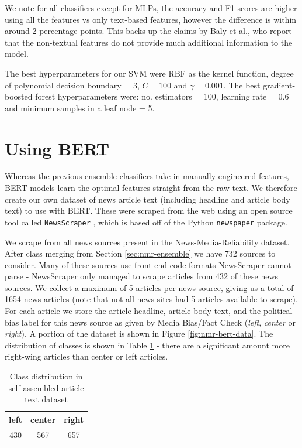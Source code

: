 We note for all classifiers except for MLPs, the accuracy and F1-scores are higher using all the features vs only text-based features, however the difference is within around 2 percentage points. This backs up the claims by Baly et al., who report that the non-textual features do not provide much additional information to the model.

The best hyperparameters for our SVM were RBF as the kernel function, degree of polynomial decision boundary = 3, $ C = 100 $ and $ \gamma = 0.001 $. The best gradient-boosted forest hyperparameters were: no. estimators = 100, learning rate = 0.6 and minimum samples in a leaf node = 5.

\section{Using BERT} \label{sec:nmr-bert}

Whereas the previous ensemble classifiers take in manually engineered features, BERT models learn the optimal features straight from the raw text. We therefore create our own dataset of news article text (including headline and article body text) to use with BERT. These were scraped from the web using an open source tool called \texttt{NewsScraper} \cite{newsscraper}, which is based off of the Python \texttt{newspaper} \cite{newspaper-python} package.

We scrape from all news sources present in the News-Media-Reliability dataset. After class merging from Section \ref{sec:nmr-ensemble} we have 732 sources to consider. Many of these sources use front-end code formats NewsScraper cannot parse - NewsScraper only managed to scrape articles from 432 of these news sources. We collect a maximum of 5 articles per news source, giving us a total of 1654 news articles (note that not all news sites had 5 articles available to scrape). For each article we store the article headline, article body text, and the political bias label for this news source as given by Media Bias/Fact Check (\textit{left}, \textit{center} or \textit{right}). A portion of the dataset is shown in Figure \ref{fig:nmr-bert-data}. The distribution of classes is shown in Table \ref{tab:nmr-bert-data-classes} - there are a significant amount more right-wing articles than center or left articles.

\begin{table}[h]
    \centering
    \begin{tabular}{|c|c|c|}
        \hline
        left & center & right \\
        \hline
        430 & 567 & 657 \\
        \hline
    \end{tabular}
    \caption{Class distribution in self-assembled article text dataset}
    \label{tab:nmr-bert-data-classes}
\end{table}

